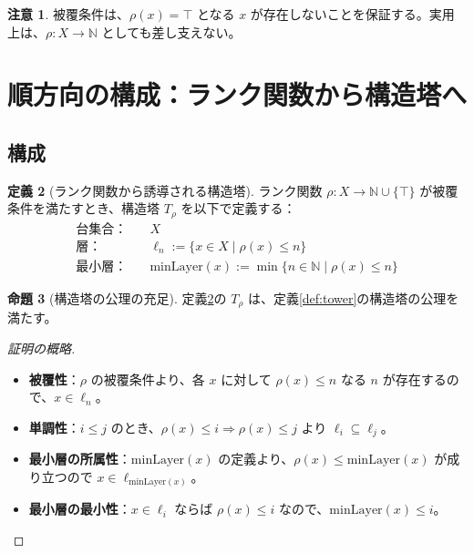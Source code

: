 \documentclass[a4paper,11pt]{ltjsarticle}
\theoremstyle{definition}
\newtheorem{definition}{定義}[section]
\newtheorem{proposition}[definition]{命題}
\newtheorem{remark}[definition]{注意}
\begin{document}
\begin{remark}
被覆条件は、$\rho(x) = \top$ となる $x$ が存在しないことを保証する。実用上は、$\rho : X \to \mathbb{N}$ としても差し支えない。
\end{remark}

\section{順方向の構成：ランク関数から構造塔へ}

\subsection{構成}

\begin{definition}[ランク関数から誘導される構造塔]\label{def:rank_to_tower}
ランク関数 $\rho : X \to \mathbb{N} \cup \{\top\}$ が被覆条件を満たすとき、構造塔 $T_\rho$ を以下で定義する：
\begin{align*}
\text{台集合：} & \quad X \\
\text{層：} & \quad \ell_n := \{x \in X \mid \rho(x) \leq n\} \\
\text{最小層：} & \quad \mathrm{minLayer}(x) := \min\{n \in \mathbb{N} \mid \rho(x) \leq n\}
\end{align*}
\end{definition}

\begin{proposition}[構造塔の公理の充足]\label{prop:rank_gives_tower}
定義\ref{def:rank_to_tower}の $T_\rho$ は、定義\ref{def:tower}の構造塔の公理を満たす。
\end{proposition}

\begin{proof}[証明の概略]
\begin{itemize}
\item \textbf{被覆性}：$\rho$ の被覆条件より、各 $x$ に対して $\rho(x) \leq n$ なる $n$ が存在するので、$x \in \ell_n$。
\item \textbf{単調性}：$i \leq j$ のとき、$\rho(x) \leq i \Rightarrow \rho(x) \leq j$ より $\ell_i \subseteq \ell_j$。
\item \textbf{最小層の所属性}：$\mathrm{minLayer}(x)$ の定義より、$\rho(x) \leq \mathrm{minLayer}(x)$ が成り立つので $x \in \ell_{\mathrm{minLayer}(x)}$。
\item \textbf{最小層の最小性}：$x \in \ell_i$ ならば $\rho(x) \leq i$ なので、$\mathrm{minLayer}(x) \leq i$。
\end{itemize}
\end{proof}
\end{document}
